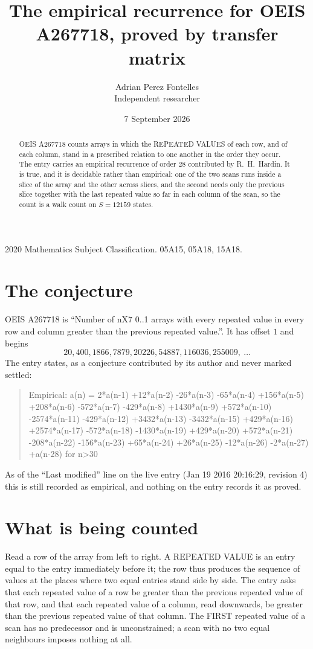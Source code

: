 \documentclass[11pt,a4paper]{article}
\title{The empirical recurrence for OEIS A267718, proved by transfer matrix}
\author{Adrian Perez Fontelles\\ \small Independent researcher}
\date{7 September 2026}
\theoremstyle{plain}
\theoremstyle{definition}
\begin{document}
\maketitle

\begin{abstract}
OEIS A267718 counts arrays in which the REPEATED VALUES of each row, and of each column, stand in a
prescribed relation to one another in the order they occur. The entry carries an empirical
recurrence of order $28$ contributed by R.~H.~Hardin. It is true, and it is decidable
rather than empirical: one of the two scans runs inside a slice of the array and the other
across slices, and the second needs only the previous slice together with the last repeated
value so far in each column of the scan, so the count is a walk count on $S=12159$ states.
\end{abstract}

\noindent\small 2020 Mathematics Subject Classification. 05A15, 05A18, 15A18.\normalsize

\section{The conjecture}

OEIS A267718 is ``Number of nX7 0..1 arrays with every repeated value in every row and column greater than the previous repeated value.''. It has offset $1$ and begins
\[
20, 400, 1866, 7879, 20226, 54887, 116036, 255009,\ \dots
\]
The entry states, as a conjecture contributed by its author and never marked settled:
\begin{quote}
Empirical: a(n) = 2*a(n-1) +12*a(n-2) -26*a(n-3) -65*a(n-4) +156*a(n-5) +208*a(n-6) -572*a(n-7) -429*a(n-8) +1430*a(n-9) +572*a(n-10) -2574*a(n-11) -429*a(n-12) +3432*a(n-13) -3432*a(n-15) +429*a(n-16) +2574*a(n-17) -572*a(n-18) -1430*a(n-19) +429*a(n-20) +572*a(n-21) -208*a(n-22) -156*a(n-23) +65*a(n-24) +26*a(n-25) -12*a(n-26) -2*a(n-27) +a(n-28) for n>30
\end{quote}
As of the ``Last modified'' line on the live entry (Jan 19 2016 20:16:29, revision 4) this is still
recorded as empirical, and nothing on the entry records it as proved.

\section{What is being counted}

Read a row of the array from left to right. A REPEATED VALUE is an entry equal to the entry
immediately before it; the row thus produces the sequence of values at the places where two
equal entries stand side by side. The entry asks that each repeated value of a row be
greater than the previous repeated value of that row, and that each repeated value of a column,
read downwards, be greater than the previous repeated value of that column. The FIRST repeated
value of a scan has no predecessor and is unconstrained; a scan with no two equal neighbours
imposes nothing at all.
\end{document}
